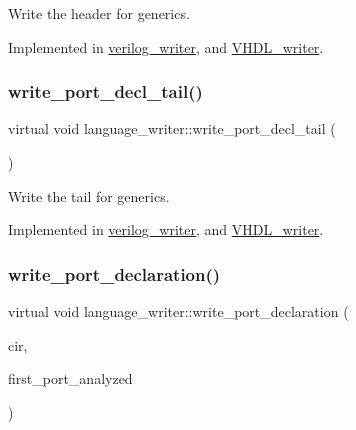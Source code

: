 Write the header for generics. 



Implemented in \hyperlink{classverilog__writer_a326f7f3aadac6d88b989a477360feb47}{verilog\+\_\+writer}, and \hyperlink{structVHDL__writer_a19481913996a5ac739d788aa43f9a2a9}{V\+H\+D\+L\+\_\+writer}.

\mbox{\label{classlanguage__writer_af20577675f401b5e75b4f0a64484529b}} 
\subsubsection{\texorpdfstring{write\+\_\+port\+\_\+decl\+\_\+tail()}{write\_port\_decl\_tail()}}
{\footnotesize\ttfamily virtual void language\+\_\+writer\+::write\+\_\+port\+\_\+decl\+\_\+tail (\begin{DoxyParamCaption}{ }\end{DoxyParamCaption})\hspace{0.3cm}{\ttfamily [pure virtual]}}



Write the tail for generics. 



Implemented in \hyperlink{classverilog__writer_adb76a5b50df9958409d5bde95d2dae79}{verilog\+\_\+writer}, and \hyperlink{structVHDL__writer_af421fa8d57e933193276a0cb76ccd0a3}{V\+H\+D\+L\+\_\+writer}.

\mbox{\label{classlanguage__writer_acf6d294fc4f807691e729b0dd13bc998}} 
\subsubsection{\texorpdfstring{write\+\_\+port\+\_\+declaration()}{write\_port\_declaration()}}
{\footnotesize\ttfamily virtual void language\+\_\+writer\+::write\+\_\+port\+\_\+declaration (\begin{DoxyParamCaption}\item[{const \hyperlink{structural__objects_8hpp_a8ea5f8cc50ab8f4c31e2751074ff60b2}{structural\+\_\+object\+Ref} \&}]{cir,  }\item[{bool}]{first\+\_\+port\+\_\+analyzed }\end{DoxyParamCaption})\hspace{0.3cm}{\ttfamily [pure virtual]}}



